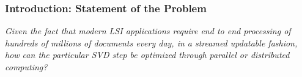 	\begin{frame}[plain]
	 	\frametitle{Introduction: Statement of the Problem}
		\begin{block}{}
    \textit{Given the fact that modern LSI applications require end to end
processing of hundreds of millions of documents every day, in a streamed
updatable fashion, how can the particular SVD step be optimized through parallel
or distributed computing?}
		\end{block} 
	\end{frame}
